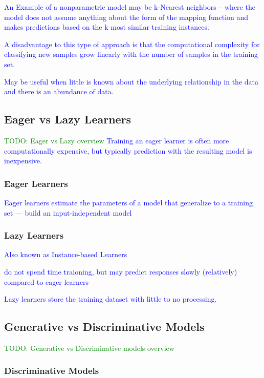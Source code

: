 \textcolor{blue}{An Example of a nonparametric model may be k-Nearest neighbors -- where the model does not assume anything about the form of the mapping function and makes predictions based on the k most similar training instances.}

\textcolor{blue}{A disadvantage to this type of approach is that the computational complexity for classifying new samples grow linearly with the number of samples in the training set.}

\textcolor{blue}{May be useful when little is known about the underlying relationship in the data and there is an abundance of data.}

\subsection{Eager vs Lazy Learners}

\textcolor{green}{TODO: Eager vs Lazy overview}
\textcolor{blue}{Training an eager learner is often more computationally expensive, but typically prediction with the resulting model is inexpensive.}

\subsubsection{Eager Learners}

\textcolor{blue}{Eager learners estimate the parameters of a model that generalize to a training set --- build an input-independent model}

\subsubsection{Lazy Learners}

\textcolor{blue}{Also known as Instance-based Learners}

\textcolor{blue}{do not spend time traioning, but may predict responses slowly (relatively) compared to eager learners}

\textcolor{blue}{Lazy learners store the training dataset with little to no processing.}


\subsection{Generative vs Discriminative Models}

\textcolor{green}{TODO: Generative vs Discriminative models overview}

\subsubsection{Discriminative Models}

